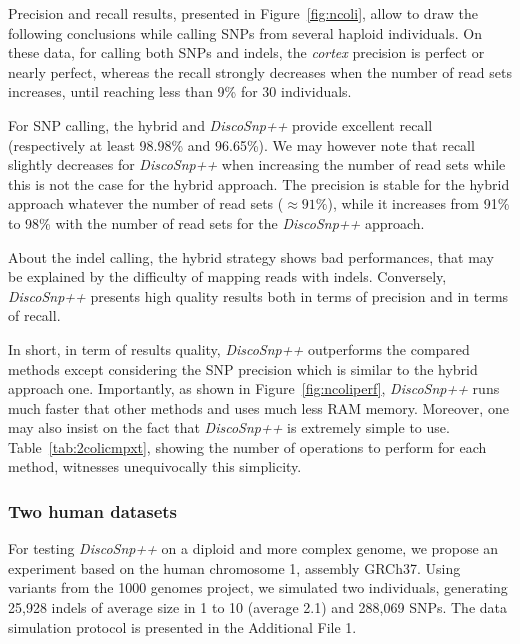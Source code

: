 \documentclass{bmcart}
\newcommand{\discopp}{{\it DiscoSnp++}\xspace}
\newcommand{\co}{{\it cortex}\xspace}
\begin{document}
Precision and recall results, presented in Figure~\ref{fig:ncoli}, allow to draw the following conclusions while calling SNPs from several haploid individuals. 
On these data, for calling both SNPs and indels, the \co precision is perfect or nearly perfect, whereas the recall strongly decreases when the number of read sets increases, until reaching less than 9\% for 30 individuals. 

For SNP calling, the hybrid and \discopp provide excellent recall (respectively at least 98.98\% and 96.65\%). We may however note that recall slightly decreases for \discopp when increasing the number of read sets while this is not the case for the hybrid approach. The precision is stable for the hybrid approach whatever the number of read sets ($\approx 91\%$), while it increases from 91\% to 98\% with the number of read sets for the \discopp approach. 


About the indel calling, the hybrid strategy shows bad performances, that may be explained by the difficulty of mapping reads with indels. Conversely, \discopp presents high quality results both in terms of precision and in terms of recall. 

In short, in term of results quality,  \discopp outperforms the compared methods except considering the SNP precision which is similar to the hybrid approach one. 
Importantly, as shown in Figure~\ref{fig:ncoliperf}, \discopp runs much faster that other methods and uses much less RAM memory. Moreover, one may also insist on the fact that \discopp is extremely simple to use. Table~\ref{tab:2colicmpxt}, showing the number of operations to perform for each method, witnesses unequivocally
this simplicity.

\subsubsection*{Two human datasets}
\label{ssec:twohumans}
For testing \discopp on a diploid and more complex genome, we propose an experiment based on the human chromosome 1, assembly GRCh37. Using variants from the 1000 genomes project, we simulated two individuals, generating 25,928 indels of average size in 1 to 10 (average 2.1) and 288,069 SNPs.
The data simulation protocol is presented in the Additional File 1. 
\end{document}
